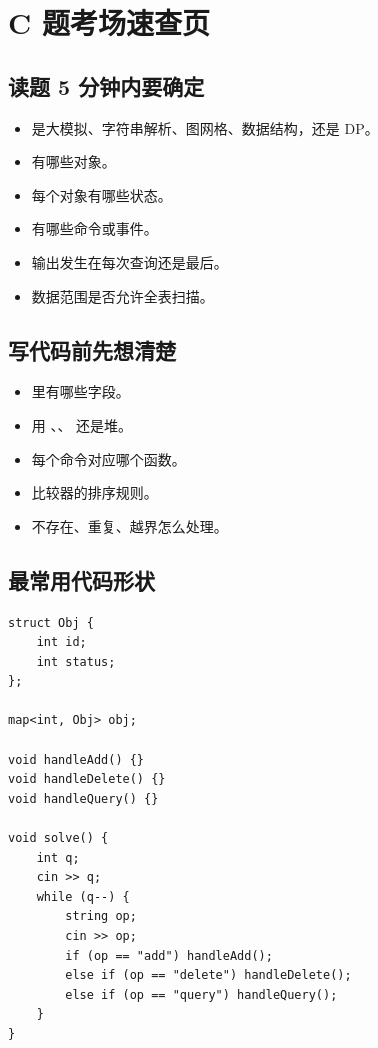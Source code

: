 \section{C 题考场速查页}\label{sec:07-41}

\subsection{读题 5 分钟内要确定}

\begin{itemize}
  \item 是大模拟、字符串解析、图网格、数据结构，还是 DP。
  \item 有哪些对象。
  \item 每个对象有哪些状态。
  \item 有哪些命令或事件。
  \item 输出发生在每次查询还是最后。
  \item 数据范围是否允许全表扫描。
\end{itemize}

\subsection{写代码前先想清楚}

\begin{itemize}
  \item {} 里有哪些字段。
  \item 用 、、 还是堆。
  \item 每个命令对应哪个函数。
  \item 比较器的排序规则。
  \item 不存在、重复、越界怎么处理。
\end{itemize}

\subsection{最常用代码形状}

\begin{lstlisting}
struct Obj {
    int id;
    int status;
};

map<int, Obj> obj;

void handleAdd() {}
void handleDelete() {}
void handleQuery() {}

void solve() {
    int q;
    cin >> q;
    while (q--) {
        string op;
        cin >> op;
        if (op == "add") handleAdd();
        else if (op == "delete") handleDelete();
        else if (op == "query") handleQuery();
    }
}
\end{lstlisting}

